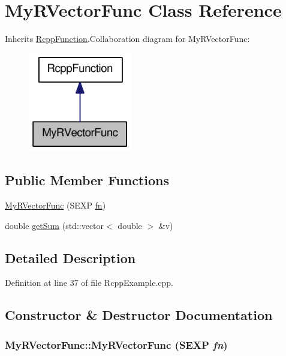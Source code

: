 \hypertarget{classMyRVectorFunc}{
\section{MyRVectorFunc Class Reference}
\label{classMyRVectorFunc}
}


Inherits \hyperlink{classRcppFunction}{RcppFunction}.Collaboration diagram for MyRVectorFunc:\nopagebreak
\begin{figure}[H]
\begin{center}
\leavevmode
\includegraphics[width=128pt]{classMyRVectorFunc__coll__graph}
\end{center}
\end{figure}
\subsection*{Public Member Functions}
\begin{DoxyCompactItemize}
\item 
\hyperlink{classMyRVectorFunc_adc09bab76bddb0c246ed98c942fd4cd8}{MyRVectorFunc} (SEXP \hyperlink{classRcppFunction_aa6b5966224b8b7d158be6cdfc3612063}{fn})
\item 
double \hyperlink{classMyRVectorFunc_a2eba5a390ca620a687e77208bfbb6df4}{getSum} (std::vector$<$ double $>$ \&v)
\end{DoxyCompactItemize}


\subsection{Detailed Description}


Definition at line 37 of file RcppExample.cpp.

\subsection{Constructor \& Destructor Documentation}
\hypertarget{classMyRVectorFunc_adc09bab76bddb0c246ed98c942fd4cd8}{
\subsubsection[{MyRVectorFunc}]{\setlength{\rightskip}{0pt plus 5cm}MyRVectorFunc::MyRVectorFunc (SEXP {\em fn})}}
\label{classMyRVectorFunc_adc09bab76bddb0c246ed98c942fd4cd8}


